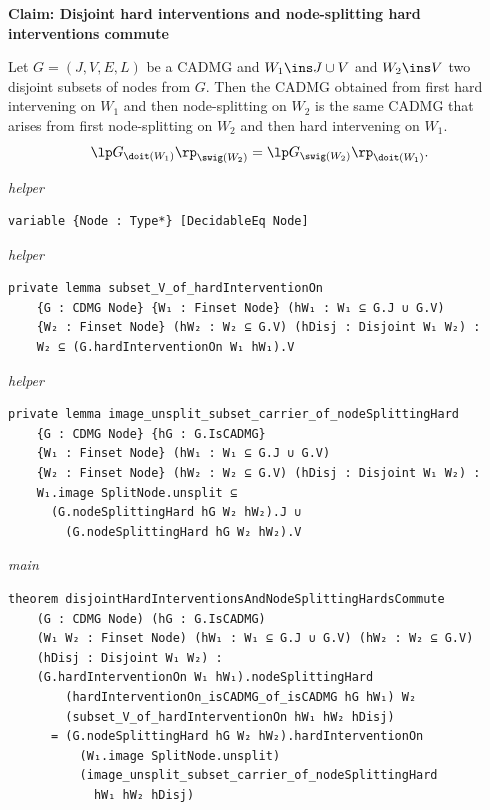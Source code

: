 \noindent\textbf{Claim: Disjoint hard interventions and node-splitting hard interventions commute}\par\smallskip
{\appendixTexSize
   Let $G=(J,V,E,L)$ be a CADMG and $W_1 \ins J \cup V$ and $W_2 \ins V$ two disjoint subsets of nodes from $G$.
   Then the CADMG obtained from first hard intervening on $W_1$ and then node-splitting on $W_2$ is the same CADMG that arises from first node-splitting on $W_2$ and then hard intervening on $W_1$.
      \[ \lp G_{\doit(W_1)} \rp_{\swig(W_2)} =  \lp G_{\swig(W_2)} \rp_{\doit(W_1)}.   \]
\par}
\smallskip
{\small\textit{helper}}
\begin{verbatim}
variable {Node : Type*} [DecidableEq Node]
\end{verbatim}
{\small\textit{helper}}
\begin{verbatim}
private lemma subset_V_of_hardInterventionOn
    {G : CDMG Node} {W₁ : Finset Node} (hW₁ : W₁ ⊆ G.J ∪ G.V)
    {W₂ : Finset Node} (hW₂ : W₂ ⊆ G.V) (hDisj : Disjoint W₁ W₂) :
    W₂ ⊆ (G.hardInterventionOn W₁ hW₁).V
\end{verbatim}
{\small\textit{helper}}
\begin{verbatim}
private lemma image_unsplit_subset_carrier_of_nodeSplittingHard
    {G : CDMG Node} {hG : G.IsCADMG}
    {W₁ : Finset Node} (hW₁ : W₁ ⊆ G.J ∪ G.V)
    {W₂ : Finset Node} (hW₂ : W₂ ⊆ G.V) (hDisj : Disjoint W₁ W₂) :
    W₁.image SplitNode.unsplit ⊆
      (G.nodeSplittingHard hG W₂ hW₂).J ∪
        (G.nodeSplittingHard hG W₂ hW₂).V
\end{verbatim}
{\small\textit{main}}
\begin{verbatim}
theorem disjointHardInterventionsAndNodeSplittingHardsCommute
    (G : CDMG Node) (hG : G.IsCADMG)
    (W₁ W₂ : Finset Node) (hW₁ : W₁ ⊆ G.J ∪ G.V) (hW₂ : W₂ ⊆ G.V)
    (hDisj : Disjoint W₁ W₂) :
    (G.hardInterventionOn W₁ hW₁).nodeSplittingHard
        (hardInterventionOn_isCADMG_of_isCADMG hG hW₁) W₂
        (subset_V_of_hardInterventionOn hW₁ hW₂ hDisj)
      = (G.nodeSplittingHard hG W₂ hW₂).hardInterventionOn
          (W₁.image SplitNode.unsplit)
          (image_unsplit_subset_carrier_of_nodeSplittingHard
            hW₁ hW₂ hDisj)
\end{verbatim}
~%

\vspace{\appendixNotesGap}

